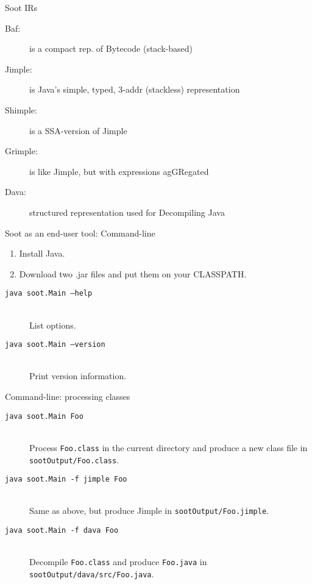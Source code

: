 \begin{slide}{Soot IRs}
\begin{description}
\item[Baf:] is a compact rep. of {\red B}ytecode (stack-based)
\item[Jimple:]  is {\red J}ava's s{\red imple}, typed,  3-addr (stackless) representation 
\item[Shimple:]  is a {\red S}SA-version of {\red Jimple}
\item[Grimple:] is like J{\red imple}, but with expressions ag{\red GR}egated 
\item[Dava:] structured representation used for {\red D}ecompiling J{\red ava}
\end{description}
\end{slide}

\begin{slide}{Soot as an end-user tool: Command-line}
\begin{enumerate}
\item Install Java.
\item Download two .jar files and put them on your CLASSPATH.
\end{enumerate}
\begin{description}
\item[\texttt{java soot.Main --help}] \hspace{1in} \\
 List options.
\item[\texttt{java soot.Main --version}] \hspace{1in} \\
 Print version information.
\end{description}
\end{slide}

\begin{slide}{Command-line: processing classes}
\begin{description}
\item[\texttt{java soot.Main Foo}] \hspace{1in} \\   
 Process \texttt{Foo.class} in the current directory
 and produce a new class file in
\texttt{sootOutput/Foo.class}.
\item[\texttt{java soot.Main -f jimple Foo}] \hspace{1in} \\
Same as above, but produce Jimple in  \texttt{sootOutput/Foo.jimple}.
\item[\texttt{java soot.Main -f dava Foo}] \hspace{1in} \\
Decompile \texttt{Foo.class} and produce \texttt{Foo.java} in 
\texttt{sootOutput/dava/src/Foo.java}.
\end{description}
\end{slide}

